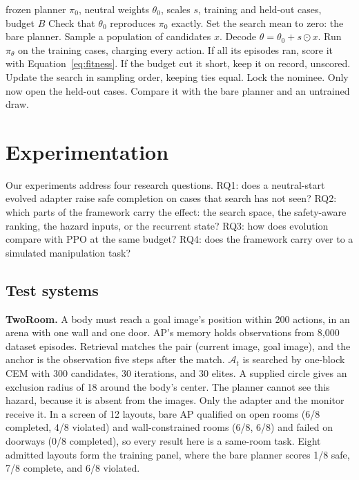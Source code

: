 \documentclass[dvipsnames,format=sigconf]{acmart}
\begin{document}
\begin{algorithm}[t]
\caption{Neutral-start adapter evolution}
\label{alg:search}
\small
\begin{algorithmic}[1]
\Require frozen planner $\pi_0$, neutral weights $\theta_0$, scales $s$, training and held-out cases, budget $B$
\State Check that $\theta_0$ reproduces $\pi_0$ exactly.
\State Set the search mean to zero: the bare planner.
  \State Sample a population of candidates $x$.
    \State Decode $\theta=\theta_0+s\odot x$.
    \State Run $\pi_\theta$ on the training cases, charging every action.
    \State If all its episodes ran, score it with Equation~\ref{eq:fitness}.
    \State If the budget cut it short, keep it on record, unscored.
  \EndFor
    \State Update the search in sampling order, keeping ties equal.
  \EndIf
\EndWhile
\State Lock the nominee.
\State Only now open the held-out cases.
\State Compare it with the bare planner and an untrained draw.
\end{algorithmic}
\end{algorithm}

\section{Experimentation}
\label{sec:design}

Our experiments address four research questions. RQ1: does a neutral-start evolved adapter raise
safe completion on cases that search has not seen? RQ2: which parts of the framework carry the
effect: the search space, the safety-aware ranking, the hazard inputs, or the recurrent state? RQ3:
how does evolution compare with PPO at the same budget? RQ4: does the framework carry over to a
simulated manipulation task?

\subsection{Test systems}
\label{sec:systems}

\textbf{TwoRoom.} A body must reach a goal image's position within 200 actions, in an arena with
one wall and one door. AP's memory holds observations from 8,000 dataset episodes. Retrieval
matches the pair (current image, goal image), and the anchor is the observation five steps after
the match. $\mathcal{A}_t$ is searched by one-block CEM with 300 candidates, 30 iterations, and 30
elites. %
A supplied circle gives an exclusion radius of 18 around the body's center. The planner cannot see
this hazard, because it is absent from the images. Only the adapter and the monitor receive it.
In a screen of 12 layouts, bare AP qualified on open rooms (6/8 completed, 4/8 violated) and
wall-constrained rooms (6/8, 6/8) and failed on doorways (0/8 completed), so every result here is a
same-room task. Eight admitted layouts form the training panel, where the bare planner scores 1/8
safe, 7/8 complete, and 6/8 violated. %
\end{document}
